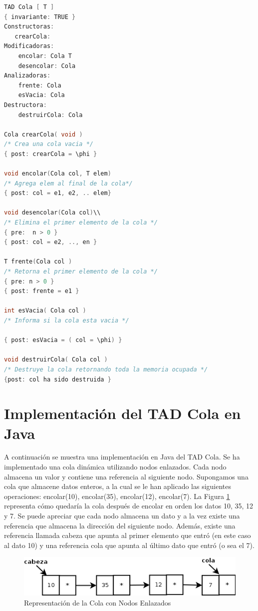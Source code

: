 \begin{lstlisting}[numbers=none, language=C]
TAD Cola [ T ]
{ invariante: TRUE }
Constructoras:
   crearCola: 
Modificadoras:
	encolar: Cola T 
	desencolar: Cola
Analizadoras:
	frente: Cola
	esVacia: Cola
Destructora:
	destruirCola: Cola

Cola crearCola( void )
/* Crea una cola vacia */
{ post: crearCola = \phi }

void encolar(Cola col, T elem)
/* Agrega elem al final de la cola*/
{ post: col = e1, e2, .. elem}

void desencolar(Cola col)\\
/* Elimina el primer elemento de la cola */
{ pre:  n > 0 }
{ post: col = e2, .., en }

T frente(Cola col )
/* Retorna el primer elemento de la cola */
{ pre: n > 0 }
{ post: frente = e1 }

int esVacia( Cola col )
/* Informa si la cola esta vacia */
 
{ post: esVacia = ( col = \phi) }

void destruirCola( Cola col )
/* Destruye la cola retornando toda la memoria ocupada */
{post: col ha sido destruida }

\end{lstlisting}

\section{Implementación del TAD Cola en Java}
A continuación se muestra una implementación en Java del TAD Cola. Se ha implementado una cola dinámica utilizando nodos enlazados.  Cada nodo almacena un valor y contiene una referencia al siguiente nodo. Supongamos una cola que almacene datos enteros, a la cual se le han aplicado las siguientes operaciones: encolar(10), encolar(35), encolar(12), encolar(7). La Figura \ref{fig:cola-nodos-enlazados} representa cómo quedaría la cola después de encolar en orden los datos 10, 35, 12 y 7. Se puede apreciar que cada nodo almacena un dato y a la vez existe una referencia que almacena la dirección del siguiente nodo. Además, existe una referencia llamada cabeza que apunta al primer elemento que entró (en este caso al dato 10) y una referencia cola que apunta al último dato que entró (o sea el 7).

\begin{figure}
	\centering
	\includegraphics[scale=0.7]{Diagramas/RepresentacionColaNodosEnlazados}
	\caption{Representación de la Cola con Nodos Enlazados}	
	\label{fig:cola-nodos-enlazados}
\end{figure}

